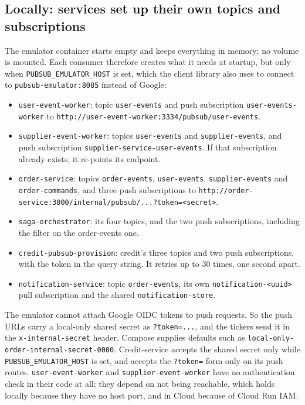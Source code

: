 \documentclass[11pt,a4paper]{article}
\newcommand{\code}[1]{\nolinkurl{#1}}
\begin{document}
\subsection{Locally: services set up their own topics and subscriptions}

The emulator container starts empty and keeps everything in memory; no volume is
mounted. Each consumer therefore creates what it needs at startup, but only when
\code{PUBSUB_EMULATOR_HOST} is set, which the client library also uses to connect to
\code{pubsub-emulator:8085} instead of Google:

\begin{itemize}
  \item \code{user-event-worker}: topic \code{user-events} and push subscription
  \code{user-events-worker} to \code{http://user-event-worker:3334/pubsub/user-events}.
  \item \code{supplier-event-worker}: topics \code{user-events} and
  \code{supplier-events}, and push subscription \code{supplier-service-user-events}. If
  that subscription already exists, it re-points its endpoint.
  \item \code{order-service}: topics \code{order-events}, \code{user-events},
  \code{supplier-events} and \code{order-commands}, and three push subscriptions to
  \code{http://order-service:3000/internal/pubsub/...?token=<secret>}.
  \item \code{saga-orchestrator}: its four topics, and the two push subscriptions,
  including the filter on the order-events one.
  \item \code{credit-pubsub-provision}: credit's three topics and two push
  subscriptions, with the token in the query string. It retries up to 30 times, one
  second apart.
  \item \code{notification-service}: topic \code{order-events}, its own
  \code{notification-<uuid>} pull subscription and the shared \code{notification-store}.
\end{itemize}

The emulator cannot attach Google OIDC tokens to push requests. So the push URLs carry
a local-only shared secret as \code{?token=...}, and the tickers send it in the
\code{x-internal-secret} header. Compose supplies defaults such as
\code{local-only-order-internal-secret-0000}. Credit-service accepts the shared secret
only while \code{PUBSUB_EMULATOR_HOST} is set, and accepts the \code{?token=} form only on
its push routes.
\code{user-event-worker} and \code{supplier-event-worker} have no authentication check in
their code at all; they depend on not being reachable, which holds locally because they
have no host port, and in Cloud because of Cloud Run IAM.
\end{document}
